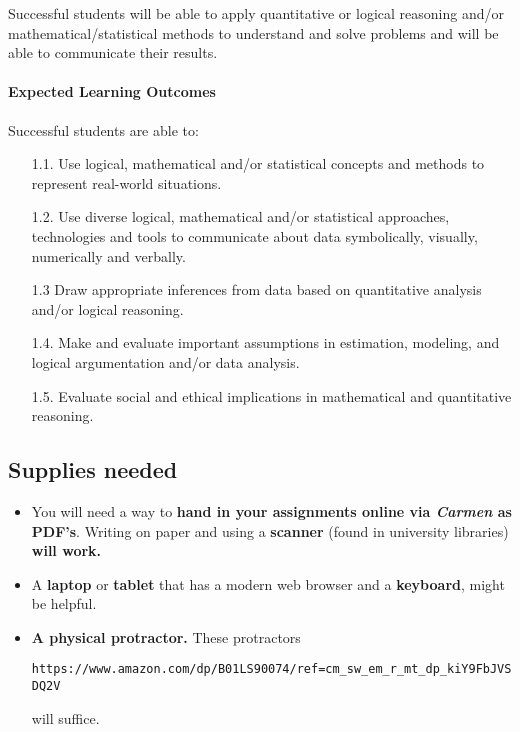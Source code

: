 \documentclass[12pt]{amsart}
\begin{document}
Successful students will be able to apply quantitative or logical reasoning
and/or mathematical/statistical methods to understand and solve problems and
will be able to communicate their results.

\paragraph{Expected Learning Outcomes}

Successful students are able to:
\begin{enumerate}
  \item[1.1.] Use logical, mathematical and/or statistical concepts and methods
    to
    represent real-world situations.
  \item[1.2.] Use diverse logical, mathematical and/or statistical approaches,
    technologies and tools to communicate about data symbolically, visually,
    numerically and verbally.
  \item[1.3] Draw appropriate inferences from data based on quantitative
    analysis
    and/or
    logical reasoning.
  \item[1.4.] Make and evaluate important assumptions in estimation, modeling,
    and
    logical argumentation and/or data analysis.
  \item[1.5.] Evaluate social and ethical implications in mathematical and
    quantitative
    reasoning.
\end{enumerate}

\subsection*{Supplies needed}
\begin{itemize}
  \item You will need a way to \textbf{hand in your assignments online via
          \textit{Carmen} as PDF's}. Writing on paper and using a
        \textbf{scanner}
        (found in university libraries) \textbf{will work.}
  \item A \textbf{laptop} or \textbf{tablet} that has a modern web
        browser and a \textbf{keyboard}, might be helpful.
  \item \textbf{A physical protractor.} These protractors
        \begin{center}\small

          \texttt{https://www.amazon.com/dp/B01LS90074/ref=cm\_sw\_em\_r\_mt\_dp\_kiY9FbJVSDQ2V}
        \end{center}
        will suffice.
\end{itemize}
\end{document}
